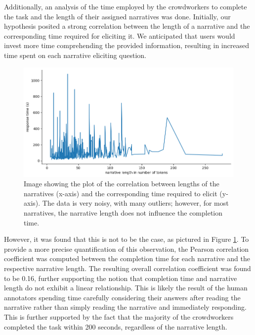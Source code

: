 Additionally, an analysis of the time employed by the crowdworkers to complete the task and the length of their assigned narratives was done. Initially, our hypothesis posited a strong correlation between the length of a narrative and the corresponding time required for eliciting it. We anticipated that users would invest more time comprehending the provided information, resulting in increased time spent on each narrative eliciting question.
\begin{figure}[!htbp]
    \centering
    \includegraphics[width=1\linewidth]{assets//imgs/dataset-pearson-correlation.png}
    \caption{Image showing the plot of the correlation between lengths of the narratives (x-axis) and the corresponding time required to elicit (y-axis). The data is very noisy, with many outliers; however, for most narratives, the narrative length does not influence the completion time.}
    \label{fig:dataset-pearson-correlation}
\end{figure}
However, it was found that this is not to be the case, as pictured in Figure \ref{fig:dataset-pearson-correlation}. To provide a more precise quantification of this observation, the Pearson correlation coefficient \cite{pearson} was computed between the completion time for each narrative and the respective narrative length. The resulting overall correlation coefficient was found to be 0.16, further supporting the notion that completion time and narrative length do not exhibit a linear relationship. This is likely the result of the human annotators spending time carefully considering their answers after reading the narrative rather than simply reading the narrative and immediately responding. This is further supported by the fact that the majority of the crowdworkers completed the task within 200 seconds, regardless of the narrative length.

